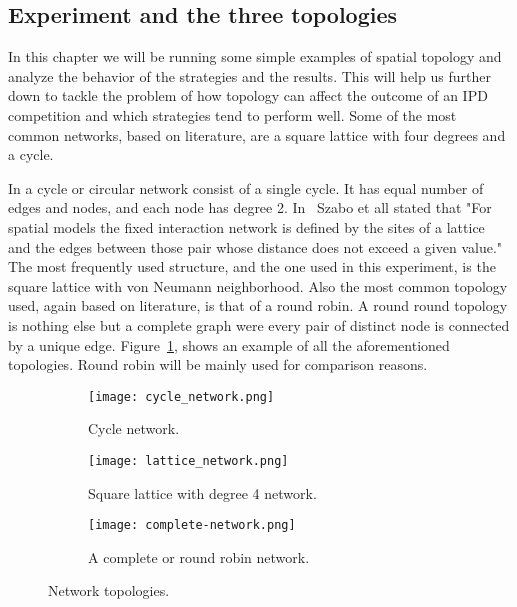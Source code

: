 \subsection{Experiment and the three topologies}

In this chapter we will be running some simple examples of spatial topology and
analyze the behavior of the strategies and the results. This will help us further
down to tackle the problem of how topology can affect the outcome of an IPD
competition and which strategies tend to perform well. Some of the most common
networks, based on literature, are a square lattice with four degrees
and a cycle.

In a cycle or circular network consist of a single cycle. It has
equal number of edges and nodes, and each node has degree 2. In~\cite{Szabo2007}
Szabo et all stated that "For spatial models the fixed interaction network is
defined by the sites of a lattice and the edges between those pair whose distance
does not exceed a given value."  The most frequently used structure, and the one
used in this experiment, is the square lattice with von Neumann neighborhood.
Also the most common topology used, again based on literature, is that of a
round robin. A round round topology is nothing else but a complete
graph were every pair of distinct node is connected by a unique edge.
Figure~\ref{fig:networks}, shows an example of all the aforementioned topologies.
Round robin will be mainly used for comparison reasons.

\begin{figure}[h]
\centering
    \begin{subfigure}[t]{0.45\textwidth}
    \centering
        \texttt{[image: cycle\_network.png]}
    \caption{Cycle network.}
    \end{subfigure}
\hfill
    \begin{subfigure}[t]{0.52\textwidth}\centering
    \centering
        \texttt{[image: lattice\_network.png]}
    \caption{Square lattice with degree 4 network.}
    \end{subfigure}
\hfill
    \begin{subfigure}[t]{0.52\textwidth}\centering
    \centering
        \texttt{[image: complete-network.png]}
    \caption{A complete or round robin network.}
    \end{subfigure}
\caption{Network topologies.}
\label{fig:networks}
\end{figure}

